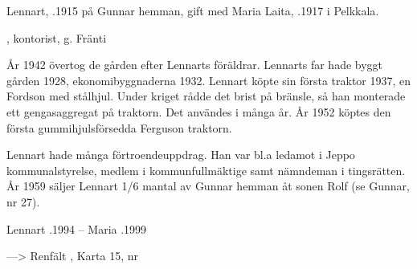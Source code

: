Lennart, .1915 på Gunnar hemman, gift med Maria Laita, .1917 i Pelkkala.
\begin{jhchildren}
  \item {}
  \item {}
  \item {}
  \item {}, kontorist, g. Fränti
  \item {}
  \item {}
\end{jhchildren}
År 1942 övertog de gården efter Lennarts föräldrar. Lennarts far hade byggt gården 1928, ekonomibyggnaderna 1932. Lennart köpte sin första traktor 1937, en Fordson med stålhjul. Under kriget rådde det brist på bränsle, så han monterade ett gengasaggregat på traktorn. Det användes i många år. År 1952 köptes den första gummihjulsförsedda Ferguson traktorn.

Lennart hade många förtroendeuppdrag. Han var bl.a ledamot i Jeppo kommunalstyrelse, medlem i kommunfullmäktige samt nämndeman i tingsrätten. År 1959 säljer Lennart 1/6 mantal av Gunnar hemman åt sonen Rolf (se Gunnar, nr 27).

Lennart .1994  --  Maria .1999


---> Renfält	,	Karta 15, nr 


